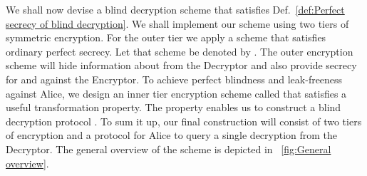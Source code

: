 \documentclass[10pt,journal]{IEEEtran}
\begin{document}
We shall now devise a blind decryption scheme 
that satisfies Def.~\ref{def:Perfect secrecy of blind decryption}.
We shall implement our scheme using two tiers of symmetric encryption.
For the outer tier we apply a scheme that satisfies
ordinary perfect secrecy.
Let that scheme be denoted by .
The outer encryption scheme will
hide information about  from the Decryptor and
also provide secrecy for  and  against the Encryptor. To achieve perfect blindness
and leak-freeness against Alice, we
design an inner tier encryption scheme called  that 
satisfies a useful transformation property. The property enables us to construct a blind
decryption protocol .
To sum it up, our final construction
will consist of two tiers of encryption and a protocol for Alice to query a single decryption
from the Decryptor. The general overview of the scheme is depicted in \figurename~\ref{fig:General overview}.
\end{document}
